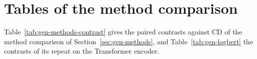 
\section{Tables of the method comparison}
\label{sec:app-method-tables}

Table~\ref{tab:gen-methods-contrast} gives the paired contrasts against
CD of the method comparison of Section~\ref{sec:gen-methods},
and Table~\ref{tab:gen-logbert} the contrasts of its repeat on the
Transformer encoder.


